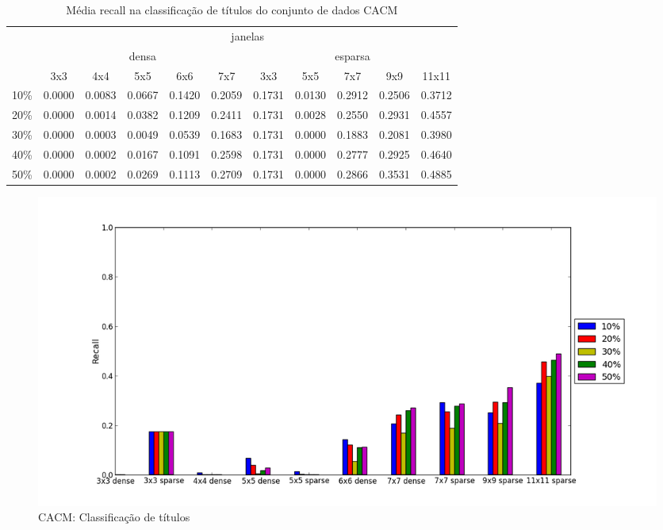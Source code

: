 \documentclass[a4paper,11pt]{article}
\begin{document}
  \begin{center}
    \begin{table}[p]
      \caption{Média recall na classificação de títulos do conjunto de dados CACM}
      \begin{tabular}{ l | c c c c c || c c c c c | }
        \cline{2-11}
        & \multicolumn{10}{|c|}{janelas} \\
        \cline{2-11}
        & \multicolumn{5}{c||}{densa} & \multicolumn{5}{c|}{esparsa} \\
        \cline{2-11}
        & 3x3 & 4x4 & 5x5 & 6x6 & 7x7 & 3x3 & 5x5 & 7x7 & 9x9 & 11x11 \\
        \hline
        \multicolumn{1}{|l|}{10\%}& 0.0000& 0.0083& 0.0667& 0.1420& 0.2059& 0.1731& 0.0130& 0.2912& 0.2506& 0.3712\\
        \multicolumn{1}{|l|}{20\%}& 0.0000& 0.0014& 0.0382& 0.1209& 0.2411& 0.1731& 0.0028& 0.2550& 0.2931& 0.4557\\
        \multicolumn{1}{|l|}{30\%}& 0.0000& 0.0003& 0.0049& 0.0539& 0.1683& 0.1731& 0.0000& 0.1883& 0.2081& 0.3980\\
        \multicolumn{1}{|l|}{40\%}& 0.0000& 0.0002& 0.0167& 0.1091& 0.2598& 0.1731& 0.0000& 0.2777& 0.2925& 0.4640\\
        \multicolumn{1}{|l|}{50\%}& 0.0000& 0.0002& 0.0269& 0.1113& 0.2709& 0.1731& 0.0000& 0.2866& 0.3531& 0.4885\\
        \hline  
      \end{tabular}
      \label{tab:cacm_recall_heading}
    \end{table}
  \end{center}

  \begin{figure}[p]
    \centerline{\includegraphics[width=1.2\textwidth]{assets/experiment_charts/cacm_TextRegion_heading_recall_or_sensitivity.png}}
    \caption{CACM: Classificação de títulos}
    \label{fig:cacm_TextRegion_heading_recall_or_sensitivity}
  \end{figure}
\end{document}
